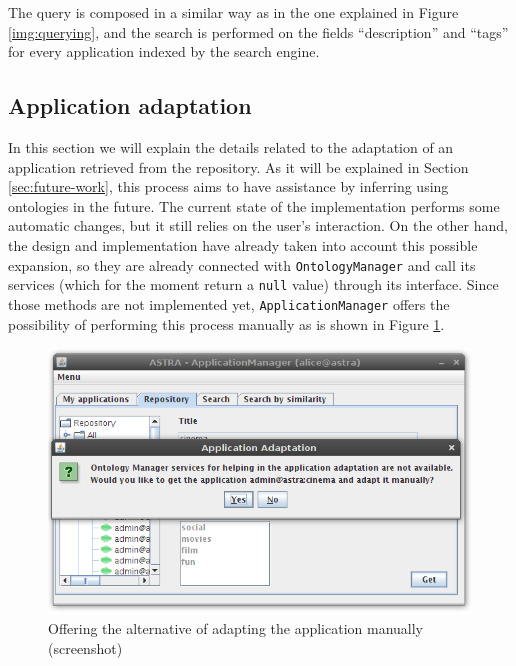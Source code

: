 The query is composed in a similar way as in the one explained in Figure
\ref{img:querying}, and the search is performed on the fields ``description''
and ``tags'' for every application indexed by the search engine.


\subsection{Application adaptation}
\label{subsec:implementation-app-adaptation}
In this section we will explain the details related to the adaptation of an
application retrieved from the repository.
As it will be explained in Section \ref{sec:future-work}, this process aims to
have assistance by inferring using ontologies in the future.
The current state of the implementation performs some automatic changes, but it
still relies on the user's interaction.
\newline
On the other hand, the design and implementation have already taken into account
this possible expansion, so they are already connected with
\verb|OntologyManager| and call its services (which for the moment return a \verb|null| value) through its
interface. Since those methods are not implemented yet, 
\verb|ApplicationManager| offers the possibility of performing this process
manually as is shown in Figure \ref{img:manual-adaptation}.

\begin{figure}[h!]
 \begin{center}

 \includegraphics[scale=0.6]{screenshots/manual-adaptation-msg.png}
  \caption{\label{img:manual-adaptation}Offering the alternative of adapting the
  application manually (screenshot)}
 \end{center}
\end{figure}

